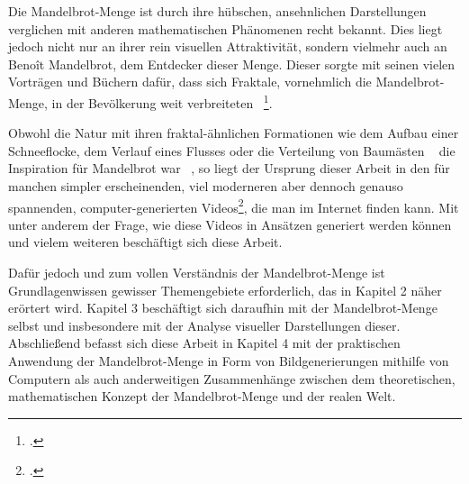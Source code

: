 
Die Mandelbrot-Menge ist durch ihre hübschen, ansehnlichen Darstellungen verglichen
mit anderen mathematischen Phänomenen recht bekannt.
Dies liegt jedoch nicht nur an ihrer rein visuellen Attraktivität,
sondern vielmehr auch an Benoît Mandelbrot, dem Entdecker dieser Menge.
Dieser sorgte mit seinen vielen Vorträgen und Büchern dafür, dass sich Fraktale,
vornehmlich die Mandelbrot-Menge, in der Bevölkerung weit verbreiteten
~\footcite[Vgl. letzten Absatz]{ibm_fractal_2011}.

Obwohl die Natur mit ihren fraktal-ähnlichen Formationen wie dem Aufbau einer
Schneeflocke, dem Verlauf eines Flusses oder die Verteilung von Baumästen
~\cite{nnart_fractals_nodate} die Inspiration für Mandelbrot war
~\cite{zink_kosmische_2014}, so liegt der Ursprung dieser Arbeit in den für
manchen simpler erscheinenden, viel moderneren aber dennoch genauso spannenden,
computer-generierten Videos\footcite[Vgl. bspw.][]{maths_town_eye_2017},
die man im Internet finden kann.
Mit unter anderem der Frage, wie diese Videos in Ansätzen generiert werden können
und vielem weiteren beschäftigt sich diese Arbeit.

Dafür jedoch und zum vollen Verständnis der Mandelbrot-Menge ist Grundlagenwissen
gewisser Themengebiete erforderlich, das in Kapitel 2 näher erörtert wird.
Kapitel 3 beschäftigt sich daraufhin mit der Mandelbrot-Menge selbst und insbesondere
mit der Analyse visueller Darstellungen dieser.
Abschließend befasst sich diese Arbeit in Kapitel 4 mit der praktischen Anwendung
der Mandelbrot-Menge in Form von Bildgenerierungen mithilfe von Computern als auch
anderweitigen Zusammenhänge zwischen dem theoretischen, mathematischen Konzept
der Mandelbrot-Menge und der realen Welt.
